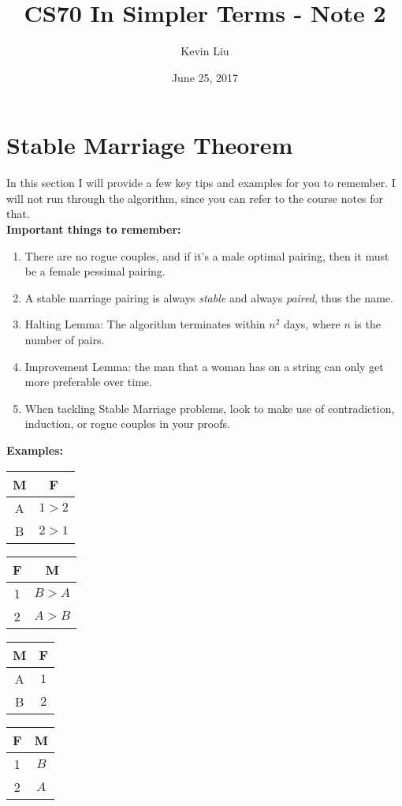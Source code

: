 \documentclass[a4paper]{article}
\title{CS70 In Simpler Terms - Note 2}
\author{Kevin Liu}
\date{June 25, 2017}
\begin{document}
\maketitle

\section{Stable Marriage Theorem}
In this section I will provide a few key tips and examples for you to remember. I will not run through the algorithm, since you can refer to the course notes for that.\\ 

\textbf{Important things to remember:}
\begin{enumerate}
	\item There are no rogue couples, and if it's a male optimal pairing, then it must be a female pessimal pairing.
	\item A stable marriage pairing is always \textit{stable} and always \textit{paired}, thus the name.
	\item Halting Lemma: The algorithm terminates within $n^2$ days, where $n$ is the number of pairs. 
	\item Improvement Lemma: the man that a woman has on a string can only get more preferable over time. 
	\item When tackling Stable Marriage problems, look to make use of contradiction, induction, or rogue couples in your proofs.
	
\end{enumerate}

\textbf{Examples:}

\begin{table}[htbp]
    \begin{tabular}[t]{|c|c|}
        \hline
        M & F\\ \hline
        A & $1>2$\\ \hline
        B & $2 >1$\\ \hline
    \end{tabular}
    \hfill
    \begin{tabular}[t]{|c|c|}
        \hline
        F & M\\ \hline
        1 & $B > A$ \\ \hline
        2 & $A > B$\\ \hline  
    \end{tabular}
    \hfill
    \begin{tabular}[t]{|c|c|}
        \hline
        M & F\\ \hline
        A & $1$\\ \hline
        B & $2$\\ \hline  
    \end{tabular}
    \hfill
    \begin{tabular}[t]{|c|c|}
        \hline
        F & M\\ \hline
        1 & $B$ \\ \hline
        2 & $A$\\ \hline  
    \end{tabular}
    \hfill
    \\
\end{table}
\end{document}
